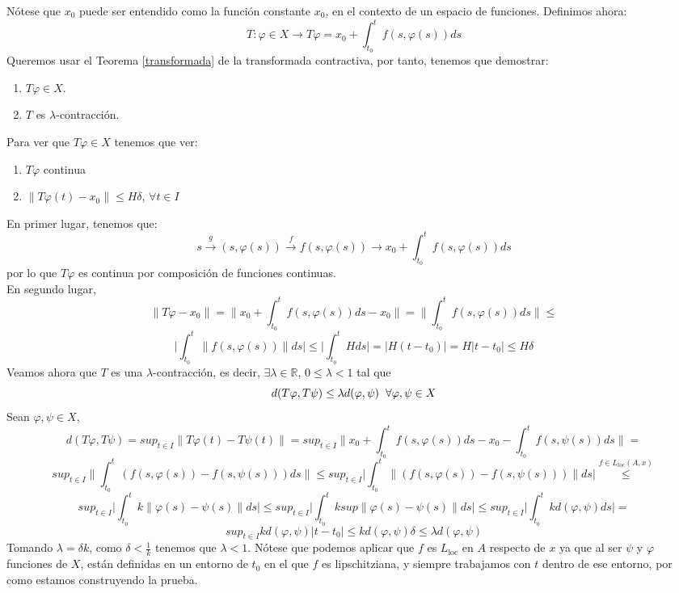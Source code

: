 \documentclass{article}
\makeatletter
\providecommand{\norm}[1]{\lVert#1\rVert}
\providecommand{\abs}[1]{\lvert#1\rvert}
\theoremstyle{theorem-style}  %
\theoremstyle{definition-style}
\theoremstyle{example-style}
\renewenvironment{proof}[1][\proofname]{\par
	\pushQED{\qed}%
	\normalfont \topsep6\p@\@plus6\p@\relax
	\list{}{%
		\settowidth{\leftmargin}{\quad:\hskip\labelsep}%
		\setlength{\labelwidth}{0pt}%
		\setlength{\itemindent}{-\leftmargin}%
	}%
	\item[\hskip\labelsep\itshape#1\@addpunct{:}]\ignorespaces
}{%
	\popQED\endlist\@endpefalse
}
\makeatother
\begin{document}
\begin{proof}
	Nótese que $ x_0 $ puede ser entendido como la función constante $ x_0 $, en el contexto de un espacio de funciones. Definimos ahora:
	\[T:\varphi \in X \longrightarrow T\varphi = x_0 + \int_{t_0}^{t} f(s, \varphi(s))ds\]
	Queremos usar el Teorema \ref{transformada} de la transformada contractiva, por tanto, tenemos que demostrar:
	\begin{enumerate}
		\item $T\varphi \in X$.
		\item $T$ es $\lambda$-contracción.
	\end{enumerate}
	Para ver que $T\varphi \in X$ tenemos que ver:
	\begin{enumerate}[	i.]
		\item $T\varphi$ continua
		\item $\norm{T\varphi (t) - x_0} \leq H\delta$, $\forall t \in I$
	\end{enumerate}
	En primer lugar, tenemos que:
	\[s \stackrel{g}{\longrightarrow} (s, \varphi (s)) \stackrel{f}{\longrightarrow} f(s, \varphi (s)) \longrightarrow x_0 + \int_{t_0}^{t}f(s,\varphi (s))ds  \]
	por lo que $T\varphi$ es continua por composición de funciones continuas. \\
	En segundo lugar, 
	\[\norm{T\varphi - x_0} = \norm{x_0 + \int_{t_0}^{t} f(s, \varphi (s)) ds - x_0} = \norm{\int_{t_0}^{t} f(s, \varphi (s)) ds} \leq \]
	\[\abs{\int_{t_0}^{t} \norm{f(s, \varphi (s))}ds} \leq \abs{\int_{t_0}^{t} H ds} = \abs{H(t - t_0)} = H\abs{t - t_0} \leq H\delta \]
	Veamos ahora que $T$ es una $\lambda$-contracción, es decir, $\exists \lambda \in \mathbb{R}$, $0 \leq \lambda < 1$ tal que
	\[d(T\varphi, T\psi) \leq \lambda d(\varphi, \psi) \hspace{0,2cm} \forall \varphi, \psi \in X\]
	Sean $\varphi, \psi \in X$, \\
	\[d(T\varphi, T\psi) = sup_{t \in I} \norm{T\varphi (t) - T\psi (t)} = sup_{t \in I} \norm{x_0 + \int_{t_0}^{t} f(s, \varphi(s))ds - x_0 - \int_{t_0}^{t} f(s, \psi(s))ds} = \]
	\[sup_{t \in I} \norm{\int_{t_0}^{t} (f(s, \varphi(s)) - f(s, \psi(s)))ds} \leq sup_{t \in I} \abs{\int_{t_0}^{t} \norm{(f(s, \varphi(s)) - f(s, \psi(s)))}ds} \stackrel{f \in L_{loc} (A, x)}{\leq} \] 
	\[sup_{t \in I} \abs{\int_{t_0}^{t} k\norm{\varphi(s) - \psi(s)}ds} \leq sup_{t \in I} \abs{\int_{t_0}^{t} k sup\norm{\varphi(s) - \psi(s)}ds} \leq sup_{t \in I} \abs{\int_{t_0}^{t} k d(\varphi, \psi)ds} = \]
	\[sup_{t \in I} kd(\varphi, \psi)\abs{t - t_0} \leq kd(\varphi, \psi)\delta \leq \lambda d(\varphi, \psi)\]
	Tomando $\lambda = \delta k$, como $\delta < \frac{1}{k}$ tenemos que $\lambda < 1$. Nótese que podemos aplicar que $ f $ es $ L_{\text{loc}} $ en $ A $ respecto de $ x $ ya que al ser $ \psi $ y $ \varphi $ funciones de $ X $, están definidas en un entorno de $ t_0 $ en el que $ f $ es lipschitziana, y siempre trabajamos con $ t $ dentro de ese entorno, por como estamos construyendo la prueba.
	

\end{proof}
\end{document}
